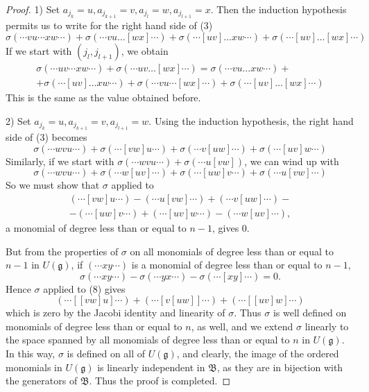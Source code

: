 \documentclass[12pt, fullpage]{article}
\newcommand{\g}{\mathfrak{g}}
\newcommand{\B}{\mathfrak{B}}
\begin{document}
\begin{proof}
1)  Set $a_{j_k}=u, a_{j_{k+1}}=v, a_{j_l}=w, a_{j_{l+1}}=x.$  Then the induction hypothesis permits us to write for the right hand side of (3)
\begin{equation}
\sigma(\cdots v u \cdots x w \cdots) + \sigma(\cdots v u \dots [wx] \cdots) + \sigma(\cdots [u v] \dots x w \cdots) + \sigma(\cdots [u v] \dots [wx] \cdots)
\end{equation}
If we start with $(j_l, j_{l+1})$, we obtain
\begin{multline}
\sigma(\cdots u v \cdots x w \cdots) + \sigma(\cdots u v \dots [wx] \cdots) = 
\sigma(\cdots v u \dots x w \cdots) + \\
+ \sigma(\cdots [u v] \dots x w \cdots) + \sigma(\cdots v u \cdots [w x] \cdots) + \sigma(\cdots [u v] \dots [w x] \cdots)
\end{multline}
This is the same as the value obtained before.  

2)  Set $a_{j_k}=u, a_{j_{k+1}}=v, a_{j_{l+1}}=w$.  Using the induction hypothesis, the right hand side of (3) becomes 
\begin{equation}
\sigma(\cdots w v u \cdots) + \sigma(\cdots [v w] u \cdots) + \sigma(\cdots v [u w] \cdots) + \sigma(\cdots [u v] w \cdots)
\end{equation}
Similarly, if we start with $\sigma (\cdots w v u \cdots) + \sigma (\cdots u [v w])$, we can wind up with 
\begin{equation}
\sigma(\cdots w v u \cdots) + \sigma(\cdots w [u v]\cdots) + \sigma(\cdots [u w] v \cdots) + \sigma(\cdots u [v w] \cdots)
\end{equation}
So we must show that $\sigma$ applied to 
\begin{multline}
(\cdots [v w] u \cdots) - (\cdots u [v w]\cdots) + (\cdots v [u w] \cdots) - \\
- (\cdots [u w] v \cdots)+ (\cdots [u v] w \cdots) - (\cdots w [u v]\cdots),
\end{multline}
a monomial of degree less than or equal to $n-1$, gives 0.  

But from the properties of $\sigma$ on all monomials of degree less than or equal to  $n-1$ in $U(\g)$, if $(\cdots x y \cdots)$ is a monomial of degree less than or equal to $n-1$,
\begin{equation}
\sigma(\cdots x y \cdots) - \sigma(\cdots y x \cdots) - \sigma(\cdots [x y] \cdots) = 0.  
\end{equation}
Hence $\sigma$ applied to (8) gives 
\begin{equation}
(\cdots [[v w] u] \cdots) + (\cdots [v [u w]]\cdots) + (\cdots [[u v] w] \cdots)
\end{equation}
which is zero by the Jacobi identity and linearity of $\sigma$.  Thus $\sigma$ is well defined on monomials of degree less than or equal to $n$, as well, and we extend $\sigma$ linearly to the space spanned by all monomials of degree less than or equal to $n$ in $U(\g)$.  In this way, $\sigma$ is defined on all of $U(\g)$, and clearly, the image of the ordered monomials in $U(\g)$ is linearly independent in $\B$, as they are in bijection with the generators of $\B$.  Thus the proof is completed.

\end{proof}
\end{document}
